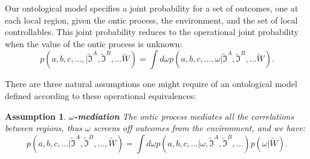 \documentclass[a4paper,onecolumn,11pt,accepted=2018-05-04]{quantumarticle}
\newtheorem{assumption}{Assumption}
\begin{document}
Our ontological model specifies a joint probability for a set of outcomes, one at each local region, given the ontic process, the environment, and the set of local controllables. This joint probability reduces to the operational joint probability when the value of the ontic process is unknown:
\begin{equation}
p(a,b,c,\dots, | \tilde{\mathcal{\mathfrak{I}}}^A, \tilde{\mathcal{\mathfrak{I}}}^B,\dots\tilde{W}) = \int d\omega p(a,b,c,\dots, \omega | \tilde{\mathcal{\mathfrak{I}}}^A, \tilde{\mathcal{\mathfrak{I}}}^B,\dots\tilde{W}).
\end{equation}


There are three natural assumptions one might require of an ontological model defined according to these operational equivalences:

\begin{assumption}
\textbf{$\omega$-mediation}
The ontic process mediates all the correlations between regions, thus $\omega$ screens off outcomes from the environment, and we have: 
\begin{equation}
p(a,b,c,\dots| \tilde{\mathcal{\mathfrak{I}}}^A, \tilde{\mathcal{\mathfrak{I}}}^B,\dots,\tilde{W}) = \int d\omega p(a,b,c,\dots | \omega, \tilde{\mathcal{\mathfrak{I}}}^A, \tilde{\mathcal{\mathfrak{I}}}^B,\dots) p(\omega|\tilde{W}).
\end{equation}

\end{assumption}
\end{document}
